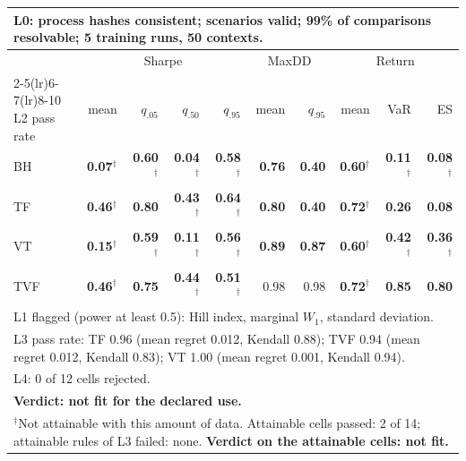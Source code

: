 \begin{tabular}{lrrrrrrrrr}
\toprule
\multicolumn{10}{p{13.5cm}}{L0: process hashes consistent; scenarios valid; 99\% of comparisons resolvable; 5 training runs, 50 contexts.} \\
\midrule
 & \multicolumn{4}{c}{Sharpe} & \multicolumn{2}{c}{MaxDD} & \multicolumn{3}{c}{Return} \\
\cmidrule(lr){2-5}\cmidrule(lr){6-7}\cmidrule(lr){8-10}
L2 pass rate & mean & $q_{.05}$ & $q_{.50}$ & $q_{.95}$ & mean & $q_{.95}$ & mean & VaR & ES \\
\midrule
BH & \textbf{0.07}$^{\dagger}$ & \textbf{0.60}$^{\dagger}$ & \textbf{0.04}$^{\dagger}$ & \textbf{0.58}$^{\dagger}$ & \textbf{0.76} & \textbf{0.40} & \textbf{0.60}$^{\dagger}$ & \textbf{0.11}$^{\dagger}$ & \textbf{0.08}$^{\dagger}$ \\
TF & \textbf{0.46}$^{\dagger}$ & \textbf{0.80} & \textbf{0.43}$^{\dagger}$ & \textbf{0.64}$^{\dagger}$ & \textbf{0.80} & \textbf{0.40} & \textbf{0.72}$^{\dagger}$ & \textbf{0.26} & \textbf{0.08} \\
VT & \textbf{0.15}$^{\dagger}$ & \textbf{0.59}$^{\dagger}$ & \textbf{0.11}$^{\dagger}$ & \textbf{0.56}$^{\dagger}$ & \textbf{0.89} & \textbf{0.87} & \textbf{0.60}$^{\dagger}$ & \textbf{0.42}$^{\dagger}$ & \textbf{0.36}$^{\dagger}$ \\
TVF & \textbf{0.46}$^{\dagger}$ & \textbf{0.75} & \textbf{0.44}$^{\dagger}$ & \textbf{0.51}$^{\dagger}$ & 0.98 & 0.98 & \textbf{0.72}$^{\dagger}$ & \textbf{0.85} & \textbf{0.80} \\
\midrule
\multicolumn{10}{p{13.5cm}}{L1 flagged (power at least 0.5): Hill index, marginal $W_1$, standard deviation.} \\
\multicolumn{10}{p{13.5cm}}{L3 pass rate: TF 0.96 (mean regret 0.012, Kendall 0.88); TVF 0.94 (mean regret 0.012, Kendall 0.83); VT 1.00 (mean regret 0.001, Kendall 0.94).} \\
\multicolumn{10}{p{13.5cm}}{L4: 0 of 12 cells rejected.} \\
\multicolumn{10}{p{13.5cm}}{\textbf{Verdict: not fit for the declared use.}} \\
\multicolumn{10}{p{13.5cm}}{$^{\dagger}$Not attainable with this amount of data. Attainable cells passed: 2 of 14; attainable rules of L3 failed: none. \textbf{Verdict on the attainable cells: not fit.}} \\
\bottomrule
\end{tabular}
